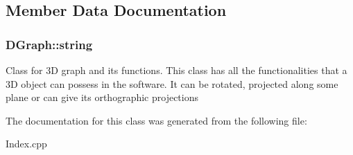\subsection{Member Data Documentation}
\subsubsection[{\texorpdfstring{string}{string}}]{\setlength{\rightskip}{0pt plus 5cm}D\+Graph\+::string}\hypertarget{classDGraph_a89521648f39efc22e84cf18d52fcb877}{}\label{classDGraph_a89521648f39efc22e84cf18d52fcb877}
Class for 3D graph and its functions. This class has all the functionalities that a 3D object can possess in the software. It can be rotated, projected along some plane or can give its orthographic projections 

The documentation for this class was generated from the following file\+:\begin{DoxyCompactItemize}
\item 
Index.\+cpp\end{DoxyCompactItemize}

